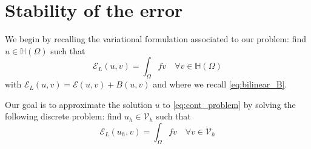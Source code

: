 \documentclass[11 pt]{article}
\numberwithin{equation}{section}
\def\cE{\mathcal{E}}
\begin{document}
\section{Stability of the error}

We begin by recalling the variational formulation associated to our problem: find $u\in\mathbb H(\Omega)$ such that 
%
\begin{equation}\label{eq:cont_problem}
    \cE_{L}(u,v)=\int_{\Omega}f v \quad \forall v\in \mathbb H(\Omega)
\end{equation}
%
with $\cE_{L}(u,v)=\cE(u,v)+B(u,v)$ and where we recall \eqref{eq:bilinear_B}.

Our goal is to approximate the solution $u$ to \eqref{eq:cont_problem} by solving the following discrete problem: find $u_h\in \mathcal V_h$ such that
%
\begin{equation}\label{eq:discr_problem}
    \cE_{L}(u_h,v)=\int_{\Omega} f v \quad \forall v\in \mathcal V_h
\end{equation}
%
\end{document}
